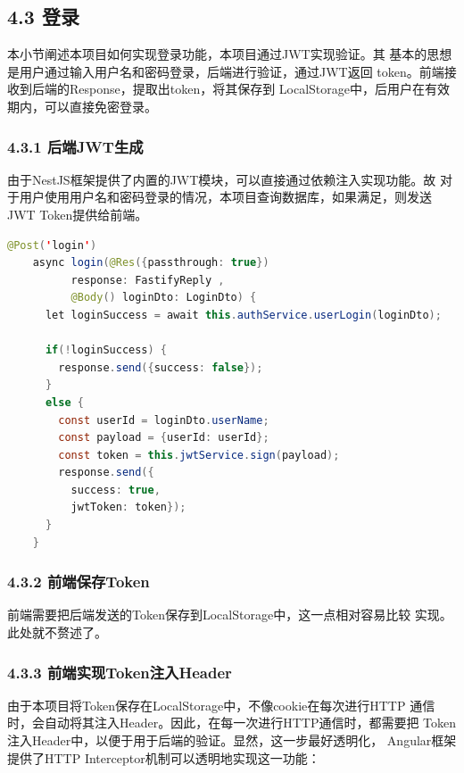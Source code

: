 \documentclass[a4paper,12pt, centering]{ctexart}
\begin{document}
  \subsection*{4.3 登录}

  本小节阐述本项目如何实现登录功能，本项目通过JWT实现验证。其
  基本的思想是用户通过输入用户名和密码登录，后端进行验证，通过JWT返回
  token。前端接收到后端的Response，提取出token，将其保存到
  LocalStorage中，后用户在有效期内，可以直接免密登录。

  \subsubsection*{4.3.1 后端JWT生成}

  由于NestJS框架提供了内置的JWT模块，可以直接通过依赖注入实现功能。故
  对于用户使用用户名和密码登录的情况，本项目查询数据库，如果满足，则发送
  JWT Token提供给前端。

  \begin{lstlisting}[language=java, caption=后端JWT生成并传递给前端]
    @Post('login')
    async login(@Res({passthrough: true}) 
          response: FastifyReply ,
          @Body() loginDto: LoginDto) {
      let loginSuccess = await this.authService.userLogin(loginDto);
  
      if(!loginSuccess) {
        response.send({success: false});
      } 
      else {
        const userId = loginDto.userName;
        const payload = {userId: userId};
        const token = this.jwtService.sign(payload);
        response.send({
          success: true,
          jwtToken: token});
      }
    }
  \end{lstlisting}

  \subsubsection*{4.3.2 前端保存Token}

  前端需要把后端发送的Token保存到LocalStorage中，这一点相对容易比较
  实现。此处就不赘述了。

  \subsubsection*{4.3.3 前端实现Token注入Header}

  由于本项目将Token保存在LocalStorage中，不像cookie在每次进行HTTP
  通信时，会自动将其注入Header。因此，在每一次进行HTTP通信时，都需要把
  Token注入Header中，以便于用于后端的验证。显然，这一步最好透明化，
  Angular框架提供了HTTP Interceptor机制可以透明地实现这一功能：
\end{document}
